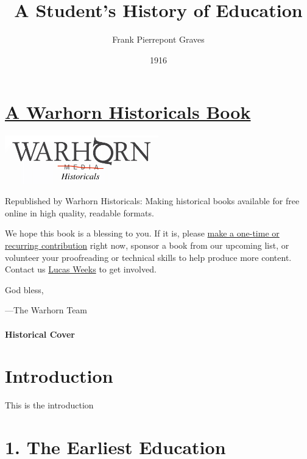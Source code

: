 \documentclass[
]{book}
\title{A Student's History of Education}
\author{Frank Pierrepont Graves}
\date{1916}
\begin{document}
\maketitle

{
\setcounter{tocdepth}{1}
\tableofcontents
}
\hypertarget{a-warhorn-historicals-book}{%
\chapter*{\texorpdfstring{\href{https://historicals.warhornmedia.com/}{A Warhorn Historicals Book}}{A Warhorn Historicals Book}}\label{a-warhorn-historicals-book}}

\includegraphics[width=0.5\textwidth,height=\textheight]{images/warhornlogo.png}

Republished by Warhorn Historicals:
Making historical books available for free online in high quality, readable formats.

We hope this book is a blessing to you. If it is, please \href{https://warhornmedia.com/give}{make a one-time or recurring contribution} right now, sponsor a book from our upcoming list, or volunteer your proofreading or technical skills to help produce more content. Contact us \href{mailto:lucas@beggarsborn.com}{Lucas Weeks} to get involved.

God bless,

---The Warhorn Team

\hypertarget{historical-cover}{%
\subsubsection*{Historical Cover}\label{historical-cover}}

\hypertarget{introduction}{%
\chapter*{Introduction}\label{introduction}}

This is the introduction

\hypertarget{the-earliest-education}{%
\chapter{1. The Earliest Education}\label{the-earliest-education}}
\end{document}
